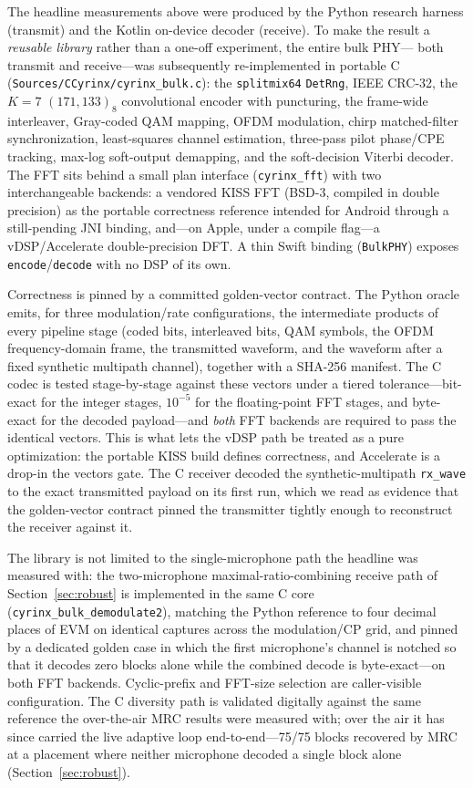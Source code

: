 \documentclass[11pt]{article}
\begin{document}
The headline measurements above were produced by the Python research harness
(transmit) and the Kotlin on-device decoder (receive). To make the result a
\emph{reusable library} rather than a one-off experiment, the entire bulk PHY---
both transmit and receive---was subsequently re-implemented in portable C
(\texttt{Sources/CCyrinx/cyrinx\_bulk.c}): the \texttt{splitmix64} \texttt{DetRng},
IEEE CRC-32, the $K{=}7$ $(171,133)_8$ convolutional encoder with puncturing, the
frame-wide interleaver, Gray-coded QAM mapping, OFDM modulation, chirp
matched-filter synchronization, least-squares channel estimation, three-pass
pilot phase/CPE tracking, max-log soft-output demapping, and the soft-decision
Viterbi decoder. The FFT sits behind a small plan interface
(\texttt{cyrinx\_fft}) with two interchangeable backends: a vendored KISS FFT
(BSD-3, compiled in double precision) as the portable correctness reference
intended for Android through a still-pending JNI binding, and---on Apple, under a compile flag---a
vDSP/Accelerate double-precision DFT. A thin Swift binding (\texttt{BulkPHY})
exposes \texttt{encode}/\texttt{decode} with no DSP of its own.

Correctness is pinned by a committed golden-vector contract. The Python oracle
emits, for three modulation/rate configurations, the intermediate products of
every pipeline stage (coded bits, interleaved bits, QAM symbols, the OFDM
frequency-domain frame, the transmitted waveform, and the waveform after a fixed
synthetic multipath channel), together with a SHA-256 manifest. The C codec is
tested stage-by-stage against these vectors under a tiered tolerance---bit-exact
for the integer stages, $10^{-5}$ for the floating-point FFT stages, and
byte-exact for the decoded payload---and \emph{both} FFT backends are required to
pass the identical vectors. This is what lets the vDSP path be treated as a pure
optimization: the portable KISS build defines correctness, and Accelerate is a
drop-in the vectors gate. The C receiver decoded the synthetic-multipath
\texttt{rx\_wave} to the exact transmitted payload on its first run, which we read
as evidence that the golden-vector contract pinned the transmitter tightly enough
to reconstruct the receiver against it.

The library is not limited to the single-microphone path the headline was
measured with: the two-microphone maximal-ratio-combining receive path of
Section~\ref{sec:robust} is implemented in the same C core
(\texttt{cyrinx\_bulk\_demodulate2}), matching the Python reference to four
decimal places of EVM on identical captures across the modulation/CP grid,
and pinned by a dedicated golden case in which the first microphone's channel
is notched so that it decodes zero blocks alone while the combined decode is
byte-exact---on both FFT backends. Cyclic-prefix and FFT-size selection are
caller-visible configuration. The C diversity path is validated digitally
against the same reference the over-the-air MRC results were measured with;
over the air it has since carried the live adaptive loop end-to-end---75/75
blocks recovered by MRC at a placement where neither microphone decoded a
single block alone (Section~\ref{sec:robust}).
\end{document}
